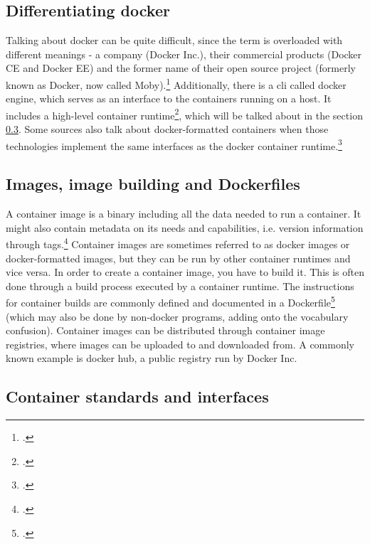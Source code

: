 \subsection{Differentiating docker}
Talking about docker can be quite difficult, since the term is overloaded with different meanings - a company (Docker Inc.), their commercial products (Docker CE and Docker EE) and the former name of their open source project (formerly known as Docker, now called Moby).\footcite[][, section 'What is Moby?']{dockerMoby}
Additionally, there is a \gls{cli} called docker engine, which serves as an interface to the containers running on a host. It includes a high-level container runtime\footcite[][, section 'Develop, Ship and Run Any Application, Anywhere']{dockerEngine}, which will be talked about in the section \ref{runtimes}.
Some sources also talk about docker-formatted containers when those technologies implement the same interfaces as the docker container runtime.\footcite[][, section '1.11. Working with Docker formatted containers']{dockerFormatted}

\subsection{Images, image building and Dockerfiles}
A container image is a binary including all the data needed to run a container. It might also contain metadata on its needs and capabilities, i.e. version information through tags.\footcite[][, section 'Docker Images']{redhatImages}
Container images are sometimes referred to as docker images or docker-formatted images, but they can be run by other container runtimes and vice versa.
In order to create a container image, you have to build it. This is often done through a build process executed by a container runtime. The instructions for container builds are commonly defined and documented in a Dockerfile\footcite[][, section 'Dockerfile reference']{dockerfileDocs} (which may also be done by non-docker programs, adding onto the vocabulary confusion).
Container images can be distributed through container image registries, where images can be uploaded to and downloaded from. A commonly known example is docker hub, a public registry run by Docker Inc.

\subsection{Container standards and interfaces} \label{runtimes}

